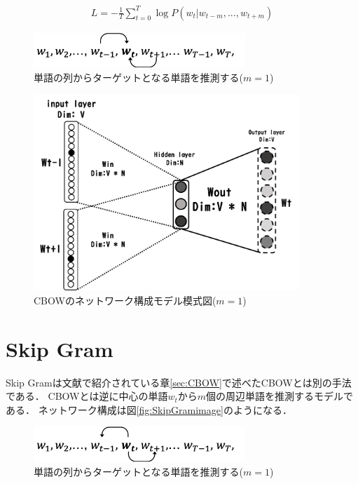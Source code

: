 \documentclass[a4j,11pt,report]{jsbook}
\begin{document}
\begin{equation}
  \label{cbow_loss}
  \begin{array}{c}
    L = -\frac{1}{T} \sum_{t = 0}^T \log P(w_{t}|w_{t-m},...,w_{t+m})
  \end{array}
\end{equation}

\begin{figure}[H]
  \centering
  \includegraphics[width = 80mm]{image/cbow_w1w2wt-1wtwt+1.png}
  \caption{単語の列からターゲットとなる単語を推測する($m = 1$)}
  \label{fig:CBOWformula}
\end{figure}

\begin{figure}[H]
  \centering
  \includegraphics[width = 100mm]{image/CBOW_windowsize_1.png}
  \caption{CBOWのネットワーク構成モデル模式図($ m = 1$) }
  \label{fig:CBOWimage}
\end{figure}

\clearpage

\section{Skip Gram \label{sec:SkipGram}}
Skip Gramは文献\cite{SkipCBOW}で紹介されている章\ref{sec:CBOW}で述べたCBOWとは別の手法である．
CBOWとは逆に中心の単語$w_{t}$から$m$個の周辺単語を推測するモデルである．
ネットワーク構成は図\ref{fig:SkipGramimage}のようになる．

\begin{figure}[H]
  \centering
  \includegraphics[width = 80mm]{image/skipgram_w1w2wt-1wtwt+1.png}
  \caption{単語の列からターゲットとなる単語を推測する($m = 1$)}
  \label{fig:Skipformula}
\end{figure}
\end{document}
